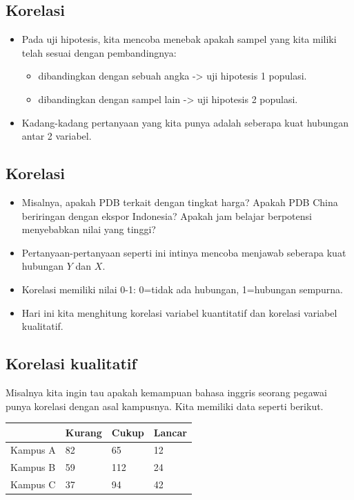 \documentclass[
  letterpaper,
  DIV=11,
  numbers=noendperiod]{scrartcl}
\begin{document}
\subsection{Korelasi}\label{korelasi}

\begin{itemize}
\item
  Pada uji hipotesis, kita mencoba menebak apakah sampel yang kita
  miliki telah sesuai dengan pembandingnya:

  \begin{itemize}
  \item
    dibandingkan dengan sebuah angka -\textgreater{} uji hipotesis 1
    populasi.
  \item
    dibandingkan dengan sampel lain -\textgreater{} uji hipotesis 2
    populasi.
  \end{itemize}
\item
  Kadang-kadang pertanyaan yang kita punya adalah seberapa kuat hubungan
  antar 2 variabel.
\end{itemize}

\subsection{Korelasi}\label{korelasi-1}

\begin{itemize}
\item
  Misalnya, apakah PDB terkait dengan tingkat harga? Apakah PDB China
  beriringan dengan ekspor Indonesia? Apakah jam belajar berpotensi
  menyebabkan nilai yang tinggi?
\item
  Pertanyaan-pertanyaan seperti ini intinya mencoba menjawab seberapa
  kuat hubungan \(Y\) dan \(X\).
\item
  Korelasi memiliki nilai 0-1: 0=tidak ada hubungan, 1=hubungan
  sempurna.
\item
  Hari ini kita menghitung korelasi variabel kuantitatif dan korelasi
  variabel kualitatif.
\end{itemize}

\subsection{Korelasi kualitatif}\label{korelasi-kualitatif}

Misalnya kita ingin tau apakah kemampuan bahasa inggris seorang pegawai
punya korelasi dengan asal kampusnya. Kita memiliki data seperti
berikut.

\begin{longtable}[]{@{}llll@{}}
\toprule\noalign{}
& Kurang & Cukup & Lancar \\
\midrule\noalign{}
\endhead
\bottomrule\noalign{}
\endlastfoot
Kampus A & 82 & 65 & 12 \\
Kampus B & 59 & 112 & 24 \\
Kampus C & 37 & 94 & 42 \\
\end{longtable}
\end{document}
